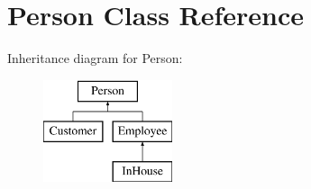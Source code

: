 \hypertarget{class_person}{}\section{Person Class Reference}
\label{class_person}
Inheritance diagram for Person\+:\begin{figure}[H]
\begin{center}
\leavevmode
\includegraphics[height=3.000000cm]{class_person}
\end{center}
\end{figure}
